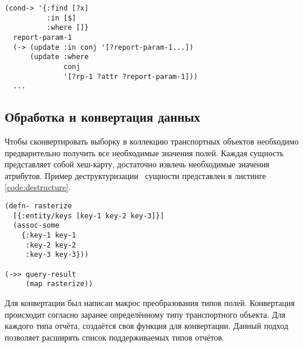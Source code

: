 \begin{lstlisting}[label=code:query-build, caption={Создание запроса}]
(cond-> '{:find [?x]
          :in [$]
          :where []}
  report-param-1
  (-> (update :in conj '[?report-param-1...])
      (update :where
              conj
              '[?rp-1 ?attr ?report-param-1]))
  ...
\end{lstlisting}

\subsection{Обработка и конвертация данных}

Чтобы сконвертировать выборку в коллекцию транспортных объектов необходимо предварительно получить все необходимые значения полей. Каждая сущность представляет собой хеш-карту, достаточно извлечь необходимые значения атрибутов. Пример деструктуризации~\cite{destructuring} сущности представлен в листинге \ref{code:destructure}.

\begin{lstlisting}[label=code:destructure, caption={Деструктуризация сущности}]
(defn- rasterize
  [{:entity/keys [key-1 key-2 key-3]}]
  (assoc-some
    {:key-1 key-1
     :key-2 key-2
     :key-3 key-3}))
 
(->> query-result
     (map rasterize))
\end{lstlisting}

Для конвертации был написан макрос преобразования типов полей. Конвертация происходит согласно заранее определённому типу транспортного объекта. Для каждого типа отчёта, создаётся своя функция для конвертации. Данный подход позволяет расширять список поддерживаемых типов отчётов.

